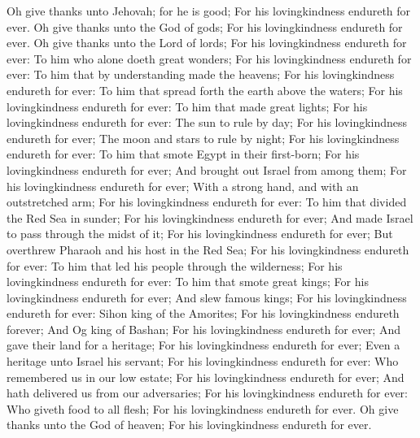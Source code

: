 Oh give thanks unto Jehovah; for he is good; For his lovingkindness endureth for ever.  Oh give thanks unto the God of gods; For his lovingkindness endureth for ever.  Oh give thanks unto the Lord of lords; For his lovingkindness endureth for ever:  To him who alone doeth great wonders; For his lovingkindness endureth for ever:  To him that by understanding made the heavens; For his lovingkindness endureth for ever:  To him that spread forth the earth above the waters; For his lovingkindness endureth for ever:  To him that made great lights; For his lovingkindness endureth for ever:  The sun to rule by day; For his lovingkindness endureth for ever;  The moon and stars to rule by night; For his lovingkindness endureth for ever:  To him that smote Egypt in their first-born; For his lovingkindness endureth for ever;  And brought out Israel from among them; For his lovingkindness endureth for ever;  With a strong hand, and with an outstretched arm; For his lovingkindness endureth for ever:  To him that divided the Red Sea in sunder; For his lovingkindness endureth for ever;  And made Israel to pass through the midst of it; For his lovingkindness endureth for ever;  But overthrew Pharaoh and his host in the Red Sea; For his lovingkindness endureth for ever:  To him that led his people through the wilderness; For his lovingkindness endureth for ever:  To him that smote great kings; For his lovingkindness endureth for ever;  And slew famous kings; For his lovingkindness endureth for ever:  Sihon king of the Amorites; For his lovingkindness endureth forever;  And Og king of Bashan; For his lovingkindness endureth for ever;  And gave their land for a heritage; For his lovingkindness endureth for ever;  Even a heritage unto Israel his servant; For his lovingkindness endureth for ever:  Who remembered us in our low estate; For his lovingkindness endureth for ever;  And hath delivered us from our adversaries; For his lovingkindness endureth for ever:  Who giveth food to all flesh; For his lovingkindness endureth for ever.  Oh give thanks unto the God of heaven; For his lovingkindness endureth for ever. 

